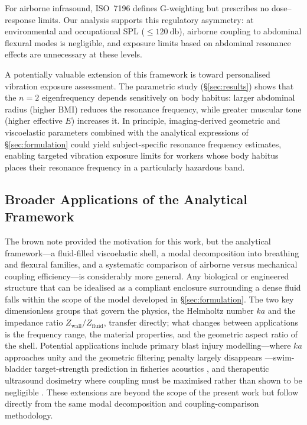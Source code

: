 For airborne infrasound, ISO~7196 defines G-weighting but prescribes no
dose--response limits.  Our analysis supports this regulatory asymmetry:
at environmental and occupational SPL ($\leq \SI{120}{\decibel}$), airborne
coupling to abdominal flexural modes is negligible, and exposure limits
based on abdominal resonance effects are unnecessary at these levels.

A potentially valuable extension of this framework is toward personalised
vibration exposure assessment.  The parametric study (\S\ref{sec:results})
shows that the $n = 2$ eigenfrequency depends sensitively on body habitus:
larger abdominal radius (higher BMI) reduces the resonance frequency, while
greater muscular tone (higher effective $E$) increases it.  In principle,
imaging-derived geometric and viscoelastic parameters \cite{Sack2023} combined with
the analytical expressions of \S\ref{sec:formulation} could yield
subject-specific resonance frequency estimates, enabling targeted vibration
exposure limits for workers whose body habitus places their resonance
frequency in a particularly hazardous band.

\subsection{Broader Applications of the Analytical Framework}
\label{sec:disc:broader}

The brown note provided the motivation for this work, but the analytical
framework---a fluid-filled viscoelastic shell, a modal decomposition into
breathing and flexural families, and a systematic comparison of airborne
versus mechanical coupling efficiency---is considerably more general.  Any
biological or engineered structure that can be idealised as a compliant
enclosure surrounding a dense fluid falls within the scope of the model
developed in \S\ref{sec:formulation}.  The two key dimensionless groups that
govern the physics, the Helmholtz number $ka$ and the impedance ratio
$Z_{\mathrm{wall}}/Z_{\mathrm{fluid}}$, transfer directly; what changes
between applications is the frequency range, the material properties, and
the geometric aspect ratio of the shell.  Potential applications include
primary blast injury modelling---where $ka$ approaches unity and the
geometric filtering penalty largely disappears
\cite{Stuhmiller2008,Owers2011}---swim-bladder target-strength prediction
in fisheries acoustics \cite{Feuillade1998,Love1978}, and therapeutic
ultrasound dosimetry where coupling must be maximised rather than shown to be
negligible \cite{terHaar2007}.  These extensions are beyond the scope of the
present work but follow directly from the same modal decomposition and
coupling-comparison methodology.

